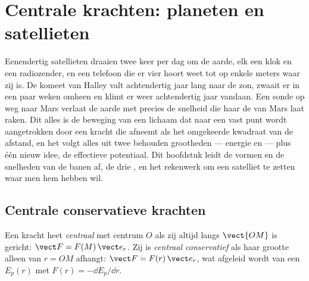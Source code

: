 \chapter{Centrale krachten: planeten en satellieten}\label{ch:b1:central-forces}

Eenendertig satellieten draaien twee keer per dag om de aarde, elk een klok
en een radiozender, en een telefoon die er vier hoort weet tot op enkele meters
waar zij is. De komeet van Halley valt achtendertig jaar lang naar de zon,
zwaait er in een paar weken omheen en klimt er weer achtendertig jaar vandaan.
Een sonde op weg naar Mars verlaat de aarde met precies de snelheid die haar
 de  van Mars laat raken. Dit alles is de beweging van een lichaam dat
naar een vast punt wordt aangetrokken door een kracht die afneemt als het
omgekeerde kwadraat van de afstand, en het volgt alles uit twee behouden
grootheden --- energie en  --- plus één nieuw idee, de effectieve
potentiaal. Dit hoofdstuk leidt de vormen en de snelheden van de banen af, de
drie , en het rekenwerk om een satelliet te zetten waar men
hem hebben wil.

\section{Centrale conservatieve krachten}

\begin{definition}\label{def:b1:central-forces:central}
Een kracht heet \emph{centraal} met centrum $O$ als zij altijd langs
$\vect{OM}$ is gericht: $\vect F = F(M)\,\vect e_r$. Zij is \emph{centraal
conservatief} als haar grootte alleen van $r = OM$ afhangt: $\vect F =
F(r)\,\vect e_r$, wat afgeleid wordt van een  $E_p(r)$ met
$F(r) = -\dd E_p/\dd r$.
\end{definition}

